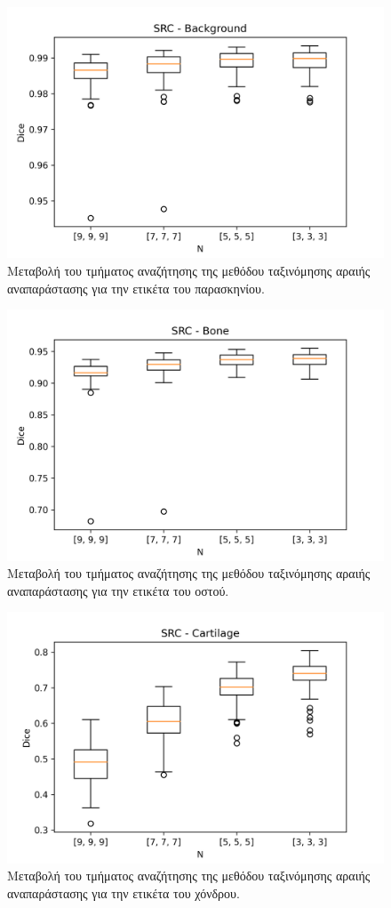 \documentclass[a4paper,12pt]{article}
\begin{document}
\begin{figure}[H]
    \centering
    \includegraphics[width=0.85\linewidth]{SRC_N_Background_plot.png}
    \caption{Μεταβολή του τμήματος αναζήτησης της μεθόδου ταξινόμησης αραιής
             αναπαράστασης για την ετικέτα του παρασκηνίου.}
    \label{fig:SRC:N:1}
\end{figure}

\begin{figure}[H]
    \centering
    \includegraphics[width=0.85\linewidth]{SRC_N_Bone_plot.png}
    \caption{Μεταβολή του τμήματος αναζήτησης της μεθόδου ταξινόμησης αραιής
             αναπαράστασης για την ετικέτα του οστού.}
    \label{fig:SRC:N:2}
\end{figure}

\begin{figure}[H]
    \centering
    \includegraphics[width=0.85\linewidth]{SRC_N_Cartilage_plot.png}
    \caption{Μεταβολή του τμήματος αναζήτησης της μεθόδου ταξινόμησης αραιής
             αναπαράστασης για την ετικέτα του χόνδρου.}
    \label{fig:SRC:N:3}
\end{figure}
\end{document}
